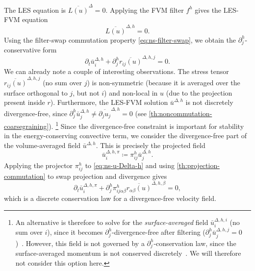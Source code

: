 \documentclass[preprint,twocolumn,5p]{elsarticle}
\begin{document}
The LES equation is $\overline{L(u)}^\Delta = 0$.
Applying the FVM filter $f^h$ gives the LES-FVM equation
\begin{equation}
    \overline{L(u)}^{\Delta, h} = 0.
\end{equation}
Using the filter-swap commutation property
\eqref{eq:ns-filter-swap}, we obtain the $\partial^h_j$-conservative form
\begin{equation} \label{eq:ns-u-Delta-h}
    \partial_t \bar{u}^{\Delta, h}_i +
    \partial^h_j \overline{r_{i j}(u)}^{\Delta, h, j} = 0.
\end{equation}
We can already note a couple of interesting observations.
The stress tensor $\overline{r_{i j}(u)}^{\Delta, h, j}$ (no sum over $j$)
is non-symmetric
(because it is averaged over the surface orthogonal to $j$, but not $i$)
and non-local in $u$ (due to the projection present inside $r$).
Furthermore, the LES-FVM solution
$\bar{u}^{\Delta, h}$ is not discretely divergence-free, since
$\partial^h_j \bar{u}^{\Delta, h}_j \neq
\overline{\partial_j u_j}^{\Delta, h} = 0$
(see \cref{th:noncommutation-coarsegraining}).
\footnote{
    An alternative is therefore to solve for the \emph{surface-averaged} field
    $\bar{u}^{\Delta, h, i}_i$ (no sum over $i$),
    since it becomes $\partial^h_j$-divergence-free after filtering
    ($\partial^h_j \bar{u}^{\Delta, h, j}_j = 0$
    )~\cite{kochkovMachineLearningAccelerated2021,
    agdesteinDiscretizeFirstFilter2025}.
    However, this field is not governed by a $\partial^h_j$-conservation law, since
    the surface-averaged momentum is not
    conserved discretely~\cite{agdesteinDiscretizeFirstFilter2025}.
    We will therefore not consider this option here.
}
Since the divergence-free constraint is important for stability in the
energy-conserving convective term,
we consider the divergence-free part of the volume-averaged field
$\bar{u}^{\Delta, h}$. This is precisely the projected field
\begin{equation}
    \bar{u}^{\Delta, h, \pi}_i \coloneq \pi^h_{i j} \bar{u}^{\Delta, h}_j.
\end{equation}
Applying the projector $\pi^h_{i j}$ to \cref{eq:ns-u-Delta-h}
and using \cref{th:projection-commutation} to swap projection and divergence
gives
\begin{equation} \label{eq:ns-u-Delta-h-pi}
    \partial_t \bar{u}^{\Delta, h, \pi}_i +
    \partial^h_j \pi^h_{i j \alpha \beta} \overline{r_{\alpha \beta}(u)}^{\Delta, h, \beta}
    = 0,
\end{equation}
which is a discrete conservation law for a divergence-free velocity field.
\end{document}
